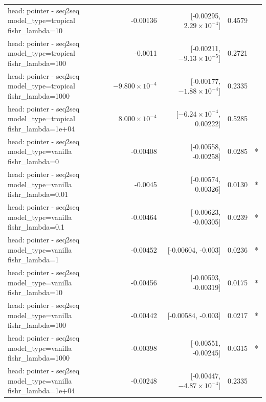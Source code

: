 \documentclass[10pt]{article}
\makeatletter
\newcommand{\stackcell}[1]{\begin{tabular}[t]{@{}l@{}}#1\end{tabular}}
\makeatother
\begin{document}
{\begin{longtable}{lrrrl}
\stackcell{head: pointer - seq2seq\\\footnotesize model\_type=tropical fishr\_lambda=10 } & -0.00136 & [-0.00295, $2.29\times10^{-4}$] & 0.4579 & \\
\stackcell{head: pointer - seq2seq\\\footnotesize model\_type=tropical fishr\_lambda=100 } & -0.0011 & [-0.00211, $-9.13\times10^{-5}$] & 0.2721 & \\
\stackcell{head: pointer - seq2seq\\\footnotesize model\_type=tropical fishr\_lambda=1000 } & $-9.800\times10^{-4}$ & [-0.00177, $-1.88\times10^{-4}$] & 0.2335 & \\
\stackcell{head: pointer - seq2seq\\\footnotesize model\_type=tropical fishr\_lambda=1e+04 } & $8.000\times10^{-4}$ & [$-6.24\times10^{-4}$, 0.00222] & 0.5285 & \\
\stackcell{head: pointer - seq2seq\\\footnotesize model\_type=vanilla fishr\_lambda=0 } & -0.00408 & [-0.00558, -0.00258] & 0.0285 & *\\
\stackcell{head: pointer - seq2seq\\\footnotesize model\_type=vanilla fishr\_lambda=0.01 } & -0.0045 & [-0.00574, -0.00326] & 0.0130 & *\\
\stackcell{head: pointer - seq2seq\\\footnotesize model\_type=vanilla fishr\_lambda=0.1 } & -0.00464 & [-0.00623, -0.00305] & 0.0239 & *\\
\stackcell{head: pointer - seq2seq\\\footnotesize model\_type=vanilla fishr\_lambda=1 } & -0.00452 & [-0.00604, -0.003] & 0.0236 & *\\
\stackcell{head: pointer - seq2seq\\\footnotesize model\_type=vanilla fishr\_lambda=10 } & -0.00456 & [-0.00593, -0.00319] & 0.0175 & *\\
\stackcell{head: pointer - seq2seq\\\footnotesize model\_type=vanilla fishr\_lambda=100 } & -0.00442 & [-0.00584, -0.003] & 0.0217 & *\\
\stackcell{head: pointer - seq2seq\\\footnotesize model\_type=vanilla fishr\_lambda=1000 } & -0.00398 & [-0.00551, -0.00245] & 0.0315 & *\\
\stackcell{head: pointer - seq2seq\\\footnotesize model\_type=vanilla fishr\_lambda=1e+04 } & -0.00248 & [-0.00447, $-4.87\times10^{-4}$] & 0.2335 & \\
\bottomrule
\end{longtable}
}
\end{document}
